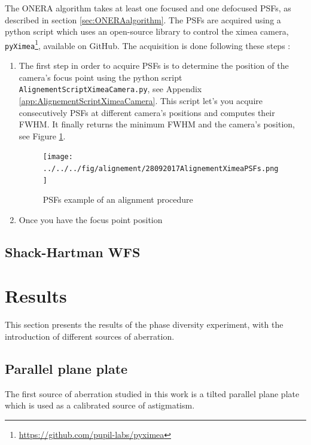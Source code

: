 The ONERA algorithm takes at least one focused and one defocused PSFs, as described in section \ref{sec:ONERAalgorithm}. The PSFs are acquired using a python script which uses an open-source library to control the ximea camera, \verb|pyXimea|\footnote{\url{https://github.com/pupil-labs/pyximea}}, available on GitHub. The acquisition is done following these steps : 

\begin{enumerate}

\item The first step in order to acquire PSFs is to determine the position of the camera's focus point using the python script \verb|AlignementScriptXimeaCamera.py|, see Appendix \ref{app:AlignementScriptXimeaCamera}. This script let's you acquire consecutively PSFs at different camera's positions and computes their FWHM. It finally returns the minimum FWHM and the camera's position, see Figure \ref{fig:28092017AlignementXimeaPSFs}.

\begin{center}
\begin{figure}
\texttt{[image: ../../../fig/alignement/28092017AlignementXimeaPSFs.png]}
\caption{PSFs example of an alignment procedure}
\label{fig:28092017AlignementXimeaPSFs}
\end{figure}
\end{center}

\item Once you have the focus point position 

\end{enumerate}

\subsection{Shack-Hartman WFS}
\label{subsec:acquisSHwfs}


\section{Results}
\label{sec:Results}

This section presents the results of the phase diversity experiment, with the introduction of different sources of aberration.

\subsection{Parallel plane plate}
\label{subsec:ParPlanePlate}

The first source of aberration studied in this work is a tilted parallel plane plate which is used as a calibrated source of astigmatism.
